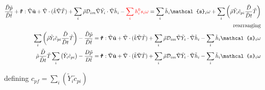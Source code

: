 \documentclass[preprint,12pt,authoryear]{elsarticle}
\begin{document}
\begin{equation}
\begin{split}
\\
        \frac{\tilde{D} \tilde{p}}{\tilde{D}\tilde{t}}
        +       
        \pmb{\tilde{\tau}}:\tilde{\nabla} \tilde{\mathbf{u}} 
        + 
        \tilde{\nabla} \cdot (\tilde{k}\tilde{\nabla} \tilde{T})
        +
        \sum\limits_i 
        \tilde{\rho}
        \mathcal{D}_{im}
        \tilde{\nabla}
        \tilde{Y}_i     
        \cdot
        \tilde{\nabla} 
        \tilde{h}_i
        -
        {\color{red} \sum_i h_i^0s_i\omega}
        =
        \sum\limits_i
        \tilde{h}_i
        \mathcal{s}_i  \omega
	+
        \sum\limits_i
        \left(
                \tilde{\rho}
                \tilde{Y}_i
                \tilde{c}_{pi}
                \frac{\tilde{D}}{\tilde{D} t}
                \tilde{T}
        \right)
\\
\text{rearranging}
\\
        \sum\limits_i
        \left(
                \tilde{\rho}
                \tilde{Y}_i
                \tilde{c}_{pi}
                \frac{\tilde{D}}{\tilde{D} t}
                \tilde{T}
        \right)
        -
        \frac{\tilde{D} \tilde{p}}{\tilde{D}\tilde{t}}
        =
        \pmb{\tilde{\tau}}:\tilde{\nabla} \tilde{\mathbf{u}} 
        + 
        \tilde{\nabla} \cdot (\tilde{k}\tilde{\nabla} \tilde{T})
        +
        \sum\limits_i 
        \tilde{\rho}
        \mathcal{D}_{im}
        \tilde{\nabla}
        \tilde{Y}_i     
        \cdot
        \tilde{\nabla} 
        \tilde{h}_i
	-
        \sum\limits_i
        \tilde{h}_i
        \mathcal{s}_i \omega
\\
        \tilde{\rho}
        \frac{\tilde{D}}{\tilde{D} t}
        \tilde{T}
        \sum\limits_i
        \left(
                \tilde{Y}_i
                \tilde{c}_{pi}
        \right)
        -
        \frac{D \tilde{p}}{D\tilde{t}}
        =
        \pmb{\tilde{\tau}}:\tilde{\nabla} \tilde{\mathbf{u}} 
        + 
        \tilde{\nabla} \cdot (\tilde{k}\tilde{\nabla} \tilde{T})
        +
        \sum\limits_i 
        \tilde{\rho}
        \mathcal{D}_{im}
        \tilde{\nabla}
        \tilde{Y}_i     
        \cdot
        \tilde{\nabla} 
        \tilde{h}_i
	-
        \sum\limits_i
        \tilde{h}_i
        \mathcal{s}_i \omega	
\end{split}
\end{equation}

defining 
$
{c}_{pf}
=
\sum\limits_i
\left(
        \tilde{Y}_i
        \tilde{c}_{pi}
\right)
$
\end{document}
